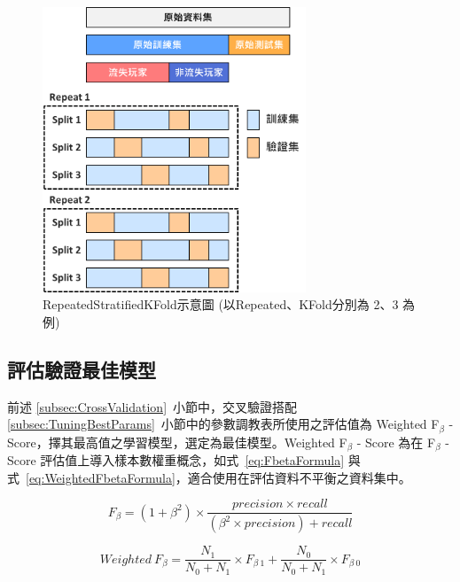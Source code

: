 \begin{figure}[!htb]
  \begin{center}
    \includegraphics[width=0.7\textwidth]{figures/Image_RepeatedStratifiedKFold.png}
    \caption[RepeatedStratifiedKFold示意圖]{RepeatedStratifiedKFold示意圖 (以Repeated、KFold分別為 2、3 為例) }
    \label{fig:Image_RepeatedStratifiedKFold}
  \end{center}
\end{figure}


\subsection{評估驗證最佳模型}
\label{subsec:EvaluateBestModel}

前述 \ref{subsec:CrossValidation}~小節中，交叉驗證搭配 \ref{subsec:TuningBestParams}~小節中的參數調教表所使用之評估值為 Weighted F$_{\beta}$ - Score，擇其最高值之學習模型，選定為最佳模型。Weighted F$_{\beta}$ - Score 為在 F$_{\beta}$ - Score 評估值上導入樣本數權重概念，如式~\ref{eq:FbetaFormula} 與式~\ref{eq:WeightedFbetaFormula}，適合使用在評估資料不平衡之資料集中。

\begin{equation}
  \label{eq:FbetaFormula}
  F_{\beta} = (1 + \beta^2) \times \frac{precision \times recall}{(\beta^2 \times precision) + recall}
\end{equation}

\begin{equation}
  \label{eq:WeightedFbetaFormula}
  Weighted\ F_{\beta} = \frac{N_1}{N_0 + N_1} \times F_{\beta\ 1} + \frac{N_0}{N_0 + N_1} \times F_{\beta\ 0}
\end{equation}

